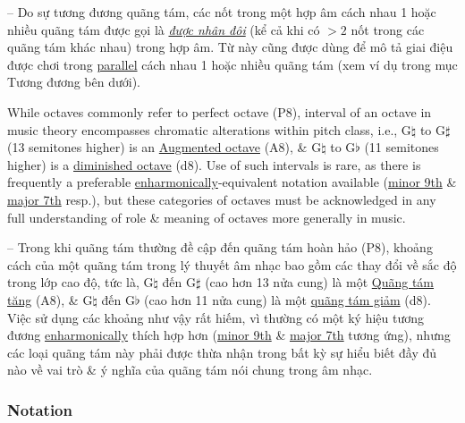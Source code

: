 \documentclass{article}
\begin{document}
-- Do sự tương đương quãng tám, các nốt trong một hợp âm cách nhau 1 hoặc nhiều quãng tám được gọi là \href{https://en.wikipedia.org/wiki/Voicing_(music)#Doubling}{\it được nhân đôi} (kể cả khi có $> 2$ nốt trong các quãng tám khác nhau) trong hợp âm. Từ này cũng được dùng để mô tả giai điệu được chơi trong \href{https://en.wikipedia.org/wiki/Contrapuntal_motion#Parallel_motion}{parallel} cách nhau 1 hoặc nhiều quãng tám (xem ví dụ trong mục Tương đương bên dưới).

While octaves commonly refer to perfect octave (P8), interval of an octave in music theory encompasses chromatic alterations within pitch class, i.e., G$\natural$ to G$\sharp$ (13 semitones higher) is an \href{https://en.wikipedia.org/wiki/Augmented_octave}{Augmented octave} (A8), \& G$\natural$ to G$\flat$ (11 semitones higher) is a \href{https://en.wikipedia.org/wiki/Diminished_octave}{diminished octave} (d8). Use of such intervals is rare, as there is frequently a preferable \href{https://en.wikipedia.org/wiki/Enharmonic}{enharmonically}-equivalent notation available (\href{https://en.wikipedia.org/wiki/Minor_ninth}{minor 9th} \& \href{https://en.wikipedia.org/wiki/Major_seventh}{major 7th} resp.), but these categories of octaves must be acknowledged in any full understanding of role \& meaning of octaves more generally in music.

-- Trong khi quãng tám thường đề cập đến quãng tám hoàn hảo (P8), khoảng cách của một quãng tám trong lý thuyết âm nhạc bao gồm các thay đổi về sắc độ trong lớp cao độ, tức là, G$\natural$ đến G$\sharp$ (cao hơn 13 nửa cung) là một \href{https://en.wikipedia.org/wiki/Augmented_octave}{Quãng tám tăng} (A8), \& G$\natural$ đến G$\flat$ (cao hơn 11 nửa cung) là một \href{https://en.wikipedia.org/wiki/Diminished_octave}{quãng tám giảm} (d8). Việc sử dụng các khoảng như vậy rất hiếm, vì thường có một ký hiệu tương đương \href{https://en.wikipedia.org/wiki/Enharmonic}{enharmonically} thích hợp hơn (\href{https://en.wikipedia.org/wiki/Minor_ninth}{minor 9th} \& \href{https://en.wikipedia.org/wiki/Major_seventh}{major 7th} tương ứng), nhưng các loại quãng tám này phải được thừa nhận trong bất kỳ sự hiểu biết đầy đủ nào về vai trò \& ý nghĩa của quãng tám nói chung trong âm nhạc.

\subsubsection{Notation}
\end{document}
